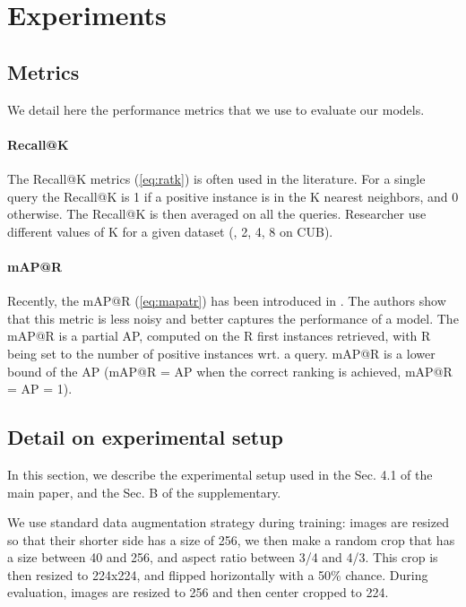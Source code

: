 \section{Experiments}


\subsection{Metrics}

We detail here the performance metrics that we use to evaluate our models.

\paragraph{Recall@K}

The Recall@K metrics (\cref{eq:ratk}) is often used in the literature. For a single query the Recall@K is 1 if a positive instance is in the K nearest neighbors, and 0 otherwise. The Recall@K is then averaged on all the queries. Researcher use different values of K for a given dataset (, 2, 4, 8 on CUB).



\paragraph{mAP@R}

Recently, the mAP@R (\cref{eq:mapatr}) has been introduced in \cite{musgrave2020metric}. The authors show that this metric is less noisy and better captures the performance of a model. The mAP@R is a partial AP, computed on the R first instances retrieved, with R being set to the number of positive instances wrt. a query. mAP@R is a lower bound of the AP (mAP@R = AP when the correct ranking is achieved, \ie mAP@R = AP = 1).



\subsection{Detail on experimental setup}

In this section, we describe the experimental setup used in the Sec. 4.1 of the main paper, and the Sec. B of the supplementary.

We use standard data augmentation strategy during training: images are resized so that their shorter side has a size of 256, we then make a random crop that has a size between 40 and 256, and aspect ratio between 3/4 and 4/3. This crop is then resized to 224x224, and flipped horizontally with a 50\% chance. During evaluation, images are resized to 256 and then center cropped to 224.


